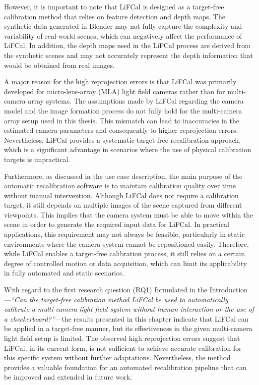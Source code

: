 \documentclass[12pt]{scrartcl}
\begin{document}
However, it is important to note that LiFCal is designed as a target-free calibration method that relies on feature detection and depth maps. The synthetic data generated in Blender may not fully capture the complexity and variability of real-world scenes, which can negatively affect the performance of LiFCal. In addition, the depth maps used in the LiFCal process are derived from the synthetic scenes and may not accurately represent the depth information that would be obtained from real images.
\newline

A major reason for the high reprojection errors is that LiFCal was primarily developed for micro-lens-array (MLA) light field cameras rather than for multi-camera array systems. The assumptions made by LiFCal regarding the camera model and the image formation process do not fully hold for the multi-camera array setup used in this thesis. This mismatch can lead to inaccuracies in the estimated camera parameters and consequently to higher reprojection errors. Nevertheless, LiFCal provides a systematic target-free recalibration approach, which is a significant advantage in scenarios where the use of physical calibration targets is impractical.
\newline

Furthermore, as discussed in the use case description, the main purpose of the automatic recalibration software is to maintain calibration quality over time without manual intervention. Although LiFCal does not require a calibration target, it still depends on multiple images of the scene captured from different viewpoints. This implies that the camera system must be able to move within the scene in order to generate the required input data for LiFCal. In practical applications, this requirement may not always be feasible, particularly in static environments where the camera system cannot be repositioned easily. Therefore, while LiFCal enables a target-free calibration process, it still relies on a certain degree of controlled motion or data acquisition, which can limit its applicability in fully automated and static scenarios.
\newline

With regard to the first research question (RQ1) formulated in the Introduction—\textit{``Can the target-free calibration method LiFCal be used to automatically calibrate a multi-camera light field system without human interaction or the use of a checkerboard?''}—the results presented in this chapter indicate that LiFCal can be applied in a target-free manner, but its effectiveness in the given multi-camera light field setup is limited. The observed high reprojection errors suggest that LiFCal, in its current form, is not sufficient to achieve accurate calibration for this specific system without further adaptations. Nevertheless, the method provides a valuable foundation for an automated recalibration pipeline that can be improved and extended in future work.
\end{document}
